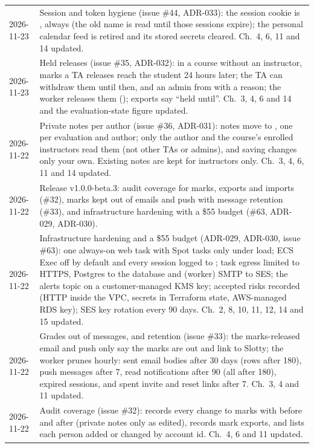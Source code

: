 \begin{xltabular}{\linewidth}{@{}l L@{}}
  2026-11-23 & Session and token hygiene (issue \#44, ADR-033): the session cookie is , always  (the old name is read until those sessions expire); the personal calendar feed is retired and its stored secrets cleared. Ch.~4, 6, 11 and 14 updated.\\
  2026-11-23 & Held releases (issue \#35, ADR-032): in a course without an instructor, marks a TA releases reach the student 24 hours later; the TA can withdraw them until then, and an admin from  with a reason; the worker releases them (); exports say ``held until''. Ch.~3, 4, 6 and 14 and the evaluation-state figure updated.\\
  2026-11-22 & Private notes per author (issue \#36, ADR-031): notes move to , one per evaluation and author; only the author and the course's enrolled instructors read them (not other TAs or admins), and saving changes only your own. Existing notes are kept for instructors only. Ch.~3, 4, 6, 11 and 14 updated.\\
  2026-11-22 & Release v1.0.0-beta.3: audit coverage for marks, exports and imports (\#32), marks kept out of emails and push with message retention (\#33), and infrastructure hardening with a \$55 budget (\#63, ADR-029, ADR-030).\\
  2026-11-22 & Infrastructure hardening and a \$55 budget (ADR-029, ADR-030, issue \#63): one always-on web task with Spot tasks only under load; ECS Exec off by default and every session logged to ; task egress limited to HTTPS, Postgres to the database and (worker) SMTP to SES; the alerts topic on a customer-managed KMS key; accepted risks recorded (HTTP inside the VPC, secrets in Terraform state, AWS-managed RDS key); SES key rotation every 90 days. Ch.~2, 8, 10, 11, 12, 14 and 15 updated.\\
  2026-11-22 & Grades out of messages, and retention (issue \#33): the marks-released email and push only say the marks are out and link to Slotty; the worker prunes hourly: sent email bodies after 30 days (rows after 180), push messages after 7, read notifications after 90 (all after 180), expired sessions, and spent invite and reset links after 7. Ch.~3, 4 and 11 updated.\\
  2026-11-22 & Audit coverage (issue \#32):  records every change to marks with before and after (private notes only as edited),  records mark exports, and  lists each person added or changed by account id. Ch.~4, 6 and 11 updated.\\

\end{xltabular}
